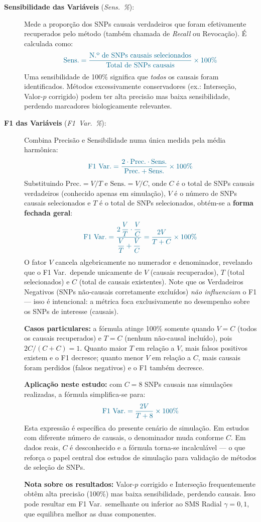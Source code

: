 \documentclass[12pt,a4paper]{article}
\newcommand{\novo}[1]{\textcolor{corNova}{#1}}
\begin{document}
\begin{description}
  \item[\novo{\textbf{Sensibilidade das Variáveis} (\textit{Sens.\ \%}):}]
  \novo{Mede a proporção dos SNPs causais verdadeiros que foram efetivamente recuperados pelo método (também chamada de \textit{Recall} ou Revocação). É calculada como:}
  \[
    \novo{\text{Sens.} = \frac{\text{N.º de SNPs causais selecionados}}{\text{Total de SNPs causais}} \times 100\%}
  \]
  \novo{Uma sensibilidade de 100\% significa que \emph{todos} os causais foram identificados. Métodos excessivamente conservadores (ex.: Interseção, Valor-$p$ corrigido) podem ter alta precisão mas baixa sensibilidade, perdendo marcadores biologicamente relevantes.}

  \item[\novo{\textbf{F1 das Variáveis} (\textit{F1\ Var.\ \%}):}]
  \novo{Combina Precisão e Sensibilidade numa única medida pela média harmônica:}
  \[
    \novo{\text{F1\ Var.} = \frac{2 \cdot \text{Prec.} \cdot \text{Sens.}}{\text{Prec.} + \text{Sens.}} \times 100\%}
  \]
  \novo{Substituindo $\text{Prec.} = V/T$ e $\text{Sens.} = V/C$, onde $C$ é o total de SNPs causais verdadeiros (conhecido apenas em simulação), $V$ é o número de SNPs causais selecionados e $T$ é o total de SNPs selecionados, obtém-se a \textbf{forma fechada geral}:}
  \[
    \novo{\text{F1\ Var.} = \frac{2\,\dfrac{V}{T}\cdot\dfrac{V}{C}}{\dfrac{V}{T}+\dfrac{V}{C}} = \frac{2V}{T + C} \times 100\%}
  \]
  \novo{O fator $V$ cancela algebricamente no numerador e denominador, revelando que o F1 Var.\ depende unicamente de $V$ (causais recuperados), $T$ (total selecionados) e $C$ (total de causais existentes). Note que os Verdadeiros Negativos (SNPs não-causais corretamente excluídos) \emph{não influenciam} o F1 — isso é intencional: a métrica foca exclusivamente no desempenho sobre os SNPs de interesse (causais).}

  \novo{\textbf{Casos particulares:} a fórmula atinge 100\% somente quando $V = C$ (todos os causais recuperados) e $T = C$ (nenhum não-causal incluído), pois $2C/(C+C) = 1$. Quanto maior $T$ em relação a $V$, mais falsos positivos existem e o F1 decresce; quanto menor $V$ em relação a $C$, mais causais foram perdidos (falsos negativos) e o F1 também decresce.}

  \novo{\textbf{Aplicação neste estudo:} com $C = 8$ SNPs causais nas simulações realizadas, a fórmula simplifica-se para:}
  \[
    \novo{\text{F1\ Var.} = \frac{2V}{T + 8} \times 100\%}
  \]
  \novo{Esta expressão é específica do presente cenário de simulação. Em estudos com diferente número de causais, o denominador muda conforme $C$. Em dados reais, $C$ é desconhecido e a fórmula torna-se incalculável — o que reforça o papel central dos estudos de simulação para validação de métodos de seleção de SNPs.}

  \novo{\textbf{Nota sobre os resultados:} Valor-$p$ corrigido e Interseção frequentemente obtêm alta precisão (100\%) mas baixa sensibilidade, perdendo causais. Isso pode resultar em F1 Var.\ semelhante ou inferior ao SMS Radial $\gamma = 0{,}1$, que equilibra melhor as duas componentes.}

\end{description}
\end{document}
